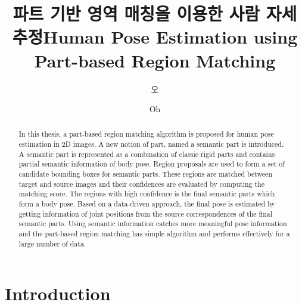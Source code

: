 \documentclass[master,english,final]{postech-ucs}
\title[korean] {파트 기반 영역 매칭을 이용한 사람 자세 추정}
\title[english]{Human Pose Estimation using Part-based Region Matching}
\author[korean] {오}{수 영}
\author[english]{Oh}{Sueyoung}
\begin{document}

    \begin{abstract}
        In this thesis, a part-based region matching algorithm is proposed for human pose estimation in 2D images. A new notion of part, named a semantic part is introduced. A semantic part is represented as a combination of classic rigid parts and contains partial semantic information of body pose. Region proposals are used to form a set of candidate bounding boxes for semantic parts. These regions are matched between target and source images and their confidences are evaluated by computing the matching score. The regions with high confidence is the final semantic parts which form a body pose. Based on a data-driven approach, the final pose is estimated by getting information of joint positions from the source correspondences of the final semantic parts. Using semantic information catches more meaningful pose information and the part-based region matching has simple algorithm and performs effectively for a large number of data.
    \end{abstract}

    \tableofcontents





\chapter{Introduction}

\end{document}
